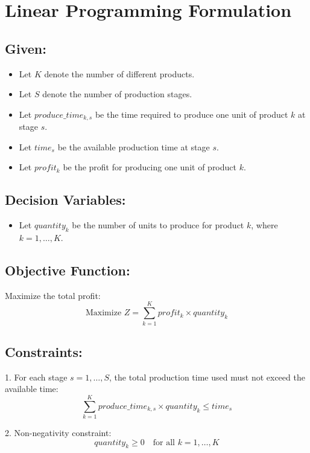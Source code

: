 \documentclass{article}
\begin{document}
\section*{Linear Programming Formulation}

\subsection*{Given:}
\begin{itemize}
    \item Let $K$ denote the number of different products.
    \item Let $S$ denote the number of production stages.
    \item Let $produce\_time_{k, s}$ be the time required to produce one unit of product $k$ at stage $s$.
    \item Let $time_{s}$ be the available production time at stage $s$.
    \item Let $profit_{k}$ be the profit for producing one unit of product $k$.
\end{itemize}

\subsection*{Decision Variables:}
\begin{itemize}
    \item Let $quantity_{k}$ be the number of units to produce for product $k$, where $k = 1, \ldots, K$.
\end{itemize}

\subsection*{Objective Function:}
Maximize the total profit:
\[
\text{Maximize } Z = \sum_{k=1}^{K} profit_{k} \times quantity_{k}
\]

\subsection*{Constraints:}
1. For each stage $s = 1, \ldots, S$, the total production time used must not exceed the available time:
\[
\sum_{k=1}^{K} produce\_time_{k, s} \times quantity_{k} \leq time_{s}
\]

2. Non-negativity constraint:
\[
quantity_{k} \geq 0 \quad \text{for all } k = 1, \ldots, K
\]
\end{document}
